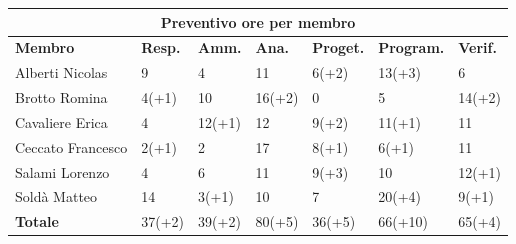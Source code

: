 \documentclass[a4paper, 12pt]{article}
\begin{document}
\begin{center}
	\begin{tabularx}{\textwidth}{|X|X|X|X|X|X|X|}
		\hline
		\multicolumn{7}{|c|}{\textbf{Preventivo ore per membro}}                                            \\
		\hline
		\hline
		\textbf{Membro}   & \textbf{Resp.}    & \textbf{Amm.}   & \textbf{Ana.} &
		\textbf{Proget.}  & \textbf{Program.} & \textbf{Verif.}                                             \\
		\hline
		Alberti Nicolas   & 9                 & 4               & 11            & 6(+2)  & 13(+3)  & 6      \\
		\hline
		Brotto Romina     & 4(+1)             & 10              & 16(+2)        & 0      & 5       & 14(+2) \\
		\hline
		Cavaliere Erica   & 4                 & 12(+1)          & 12            & 9(+2)  & 11(+1)  & 11     \\
		\hline
		Ceccato Francesco & 2(+1)             & 2               & 17            & 8(+1)  & 6(+1)   & 11     \\
		\hline
		Salami Lorenzo    & 4                 & 6               & 11            & 9(+3)  & 10      & 12(+1) \\
		\hline
		Soldà Matteo      & 14                & 3(+1)           & 10            & 7      & 20(+4)  & 9(+1)  \\
		\hline
		\hline
		\textbf{Totale}   & 37(+2)            & 39(+2)          & 80(+5)        & 36(+5) & 66(+10) & 65(+4) \\
		\hline
	\end{tabularx}\\[8pt]
	\mbox{}\\
\end{center}

\newpage
\end{document}
